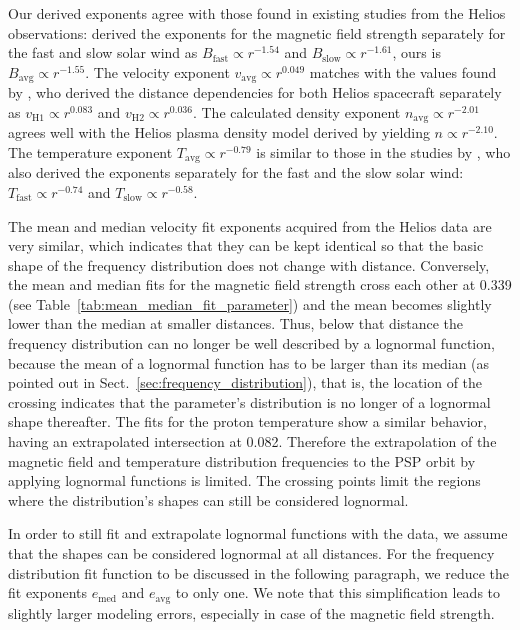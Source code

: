 \documentclass[]{aa}
\begin{document}
        Our derived exponents agree with those found in existing studies from the Helios observations: \citet{Mariani1978} derived the exponents for the magnetic field strength separately for the fast and slow solar wind as $B_\text{fast} \propto r^{-1.54}$ and $B_\text{slow} \propto r^{-1.61}$, ours is $B_\text{avg} \propto r^{-1.55}$.
        The velocity exponent $v_\text{avg} \propto r^{0.049}$ matches with the values found by \citet{Schwenn1983,Schwenn1990}, who derived the distance dependencies for both Helios spacecraft separately as $v_\text{H1} \propto r^{0.083}$ and $v_\text{H2} \propto r^{0.036}$. The calculated density exponent $n_\text{avg} \propto r^{-2.01}$ agrees well with the Helios plasma density model derived by \citet{Bougeret1984} yielding $n \propto r^{-2.10}$.
        The temperature exponent $T_\text{avg} \propto r^{-0.79}$ is similar to those in the studies by \citet{Hellinger2011,Hellinger2013}, who also derived the exponents separately for the fast and the slow solar wind: $T_\text{fast} \propto r^{-0.74}$ and $T_\text{slow} \propto r^{-0.58}$.

        The mean and median velocity fit exponents acquired from the Helios data are very similar, which indicates that they can be kept identical so that the basic shape of the frequency distribution does not change with distance. Conversely, the mean and median fits for the magnetic field strength cross each other at \SI{0.339}{\au} (see Table~\ref{tab:mean_median_fit_parameter}) and the mean becomes slightly lower than the median at smaller distances. Thus, below that distance the frequency distribution can no longer be well described by a lognormal function, because the mean of a lognormal function has to be larger than its median (as pointed out in Sect.~\ref{sec:frequency_distribution}), that is, the location of the crossing indicates that the parameter's distribution is no longer of a lognormal shape thereafter. The fits for the proton temperature show a similar behavior, having an extrapolated intersection at \SI{0.082}{\au}. Therefore the extrapolation of the magnetic field and temperature distribution frequencies to the PSP orbit by applying lognormal functions is limited. The crossing points limit the regions where the distribution's shapes can still be considered lognormal.

        In order to still fit and extrapolate lognormal functions with the data, we assume that the shapes can be considered lognormal at all distances. For the frequency distribution fit function to be discussed in the following paragraph, we reduce the fit exponents $e_\text{med}$ and $e_\text{avg}$ to only one. We note that this simplification leads to slightly larger modeling errors, especially in case of the magnetic field strength.
\end{document}
